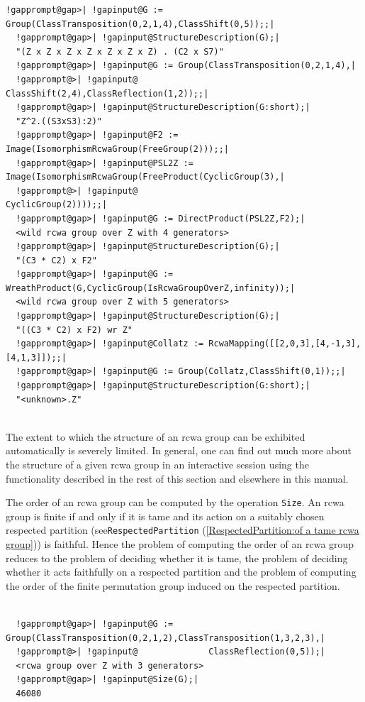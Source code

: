 \documentclass[a4paper,11pt]{report}
\begin{document}
{{{\begin{Verbatim}[commandchars=!@|,fontsize=\small,frame=single,label=Example]
  !gapprompt@gap>| !gapinput@G := Group(ClassTransposition(0,2,1,4),ClassShift(0,5));;|
  !gapprompt@gap>| !gapinput@StructureDescription(G);|
  "(Z x Z x Z x Z x Z x Z x Z) . (C2 x S7)"
  !gapprompt@gap>| !gapinput@G := Group(ClassTransposition(0,2,1,4),|
  !gapprompt@>| !gapinput@              ClassShift(2,4),ClassReflection(1,2));;|
  !gapprompt@gap>| !gapinput@StructureDescription(G:short);|
  "Z^2.((S3xS3):2)"
  !gapprompt@gap>| !gapinput@F2 := Image(IsomorphismRcwaGroup(FreeGroup(2)));;|
  !gapprompt@gap>| !gapinput@PSL2Z := Image(IsomorphismRcwaGroup(FreeProduct(CyclicGroup(3),|
  !gapprompt@>| !gapinput@                                                   CyclicGroup(2))));;|
  !gapprompt@gap>| !gapinput@G := DirectProduct(PSL2Z,F2);|
  <wild rcwa group over Z with 4 generators>
  !gapprompt@gap>| !gapinput@StructureDescription(G);|
  "(C3 * C2) x F2"
  !gapprompt@gap>| !gapinput@G := WreathProduct(G,CyclicGroup(IsRcwaGroupOverZ,infinity));|
  <wild rcwa group over Z with 5 generators>
  !gapprompt@gap>| !gapinput@StructureDescription(G);|
  "((C3 * C2) x F2) wr Z"
  !gapprompt@gap>| !gapinput@Collatz := RcwaMapping([[2,0,3],[4,-1,3],[4,1,3]]);;|
  !gapprompt@gap>| !gapinput@G := Group(Collatz,ClassShift(0,1));;|
  !gapprompt@gap>| !gapinput@StructureDescription(G:short);|
  "<unknown>.Z"
  
\end{Verbatim}
 }

 The extent to which the structure of an rcwa group can be exhibited
automatically is severely limited. In general, one can find out much more
about the structure of a given rcwa group in an interactive session using the
functionality described in the rest of this section and elsewhere in this
manual. 

  The order of an rcwa group can be computed by the operation \texttt{Size}. An rcwa group is finite if and only if it is tame and its action on a
suitably chosen respected partition (see{\nobreakspace}\texttt{RespectedPartition} (\ref{RespectedPartition:of a tame rcwa group})) is faithful. Hence the problem of computing the order of an rcwa group
reduces to the problem of deciding whether it is tame, the problem of deciding
whether it acts faithfully on a respected partition and the problem of
computing the order of the finite permutation group induced on the respected
partition. 
\begin{Verbatim}[commandchars=!@|,fontsize=\small,frame=single,label=Example]
  
  !gapprompt@gap>| !gapinput@G := Group(ClassTransposition(0,2,1,2),ClassTransposition(1,3,2,3),|
  !gapprompt@>| !gapinput@              ClassReflection(0,5));|
  <rcwa group over Z with 3 generators>
  !gapprompt@gap>| !gapinput@Size(G);|
  46080
  

\end{Verbatim}}}
\end{document}
